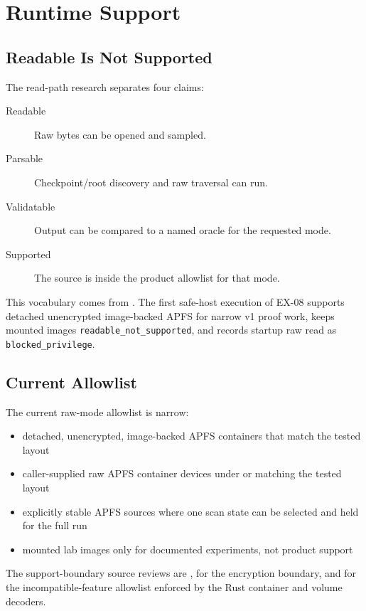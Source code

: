 \chapter{Runtime Support}

\section{Readable Is Not Supported}

The read-path research separates four claims:

\begin{description}
  \item[Readable] Raw bytes can be opened and sampled.
  \item[Parsable] Checkpoint/root discovery and raw traversal can run.
  \item[Validatable] Output can be compared to a named oracle for the requested
  mode.
  \item[Supported] The source is inside the product allowlist for that mode.
\end{description}

This vocabulary comes from
. The first
safe-host execution of EX-08 supports detached unencrypted image-backed APFS
for narrow v1 proof work, keeps mounted images
\texttt{readable\_not\_supported}, and records startup raw read as
\texttt{blocked\_privilege}.

\section{Current Allowlist}

The current raw-mode allowlist is narrow:

\begin{itemize}
  \item detached, unencrypted, image-backed APFS containers that match the tested
  layout
  \item caller-supplied raw APFS container devices under  or
   matching the tested layout
  \item explicitly stable APFS sources where one scan state can be selected and
  held for the full run
  \item mounted lab images only for documented experiments, not product support
\end{itemize}

The support-boundary source reviews are
,
 for the
encryption boundary, and
 for the
incompatible-feature allowlist enforced by the Rust container and volume
decoders.

